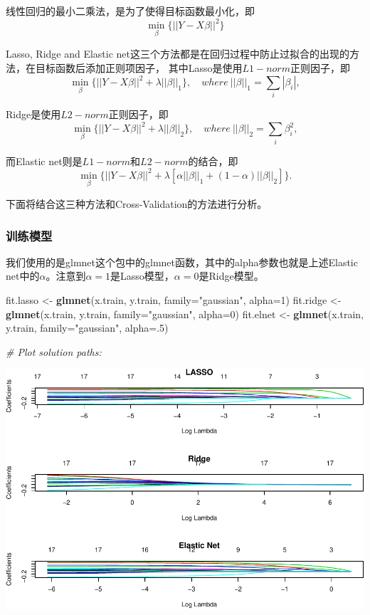 \documentclass[]{article}
\newenvironment{Shaded}{\begin{snugshade}}{\end{snugshade}}
\newcommand{\KeywordTok}[1]{\textcolor[rgb]{0.13,0.29,0.53}{\textbf{#1}}}
\newcommand{\DataTypeTok}[1]{\textcolor[rgb]{0.13,0.29,0.53}{#1}}
\newcommand{\DecValTok}[1]{\textcolor[rgb]{0.00,0.00,0.81}{#1}}
\newcommand{\StringTok}[1]{\textcolor[rgb]{0.31,0.60,0.02}{#1}}
\newcommand{\CommentTok}[1]{\textcolor[rgb]{0.56,0.35,0.01}{\textit{#1}}}
\newcommand{\NormalTok}[1]{#1}
\begin{document}
线性回归的最小二乘法，是为了使得目标函数最小化，即 \[
\min_\beta\{||Y-X\beta||^2\}
\]

Lasso, Ridge and Elastic
net这三个方法都是在回归过程中防止过拟合的出现的方法，在目标函数后添加正则项因子，
其中Lasso是使用\(L1-norm\)正则因子，即 \[
\min_\beta\{||Y-X\beta||^2 + \lambda ||\beta||_1\},\quad where\ ||\beta||_1 = \sum_i|\beta_i|,
\]

Ridge是使用\(L2-norm\)正则因子，即 \[
\min_\beta\{||Y-X\beta||^2 + \lambda ||\beta||_2\},\quad where\ ||\beta||_2 = \sum_i\beta_i^2,
\]

而Elastic net则是\(L1-norm\)和\(L2-norm\)的结合，即 \[
\min_\beta\{||Y-X\beta||^2 + \lambda[\alpha||\beta||_1 + (1-\alpha) ||\beta||_2 ] \}.
\]

下面将结合这三种方法和Cross-Validation的方法进行分析。

\subsubsection{训练模型}

我们使用的是glmnet这个包中的glmnet函数，其中的alpha参数也就是上述Elastic
net中的\(\alpha\)。注意到\(\alpha = 1\)是Lasso模型，\(\alpha = 0\)是Ridge模型。

\begin{Shaded}
\begin{Highlighting}[]
\NormalTok{fit.lasso <-}\StringTok{ }\KeywordTok{glmnet}\NormalTok{(x.train, y.train, }\DataTypeTok{family=}\StringTok{"gaussian"}\NormalTok{, }\DataTypeTok{alpha=}\DecValTok{1}\NormalTok{)}
\NormalTok{fit.ridge <-}\StringTok{ }\KeywordTok{glmnet}\NormalTok{(x.train, y.train, }\DataTypeTok{family=}\StringTok{"gaussian"}\NormalTok{, }\DataTypeTok{alpha=}\DecValTok{0}\NormalTok{)}
\NormalTok{fit.elnet <-}\StringTok{ }\KeywordTok{glmnet}\NormalTok{(x.train, y.train, }\DataTypeTok{family=}\StringTok{"gaussian"}\NormalTok{, }\DataTypeTok{alpha=}\NormalTok{.}\DecValTok{5}\NormalTok{)}

\CommentTok{# Plot solution paths:}
\end{Highlighting}
\end{Shaded}

\includegraphics{FinalProjectForRegressionAnalysis_files/figure-latex/unnamed-chunk-42-1.pdf}
\end{document}
